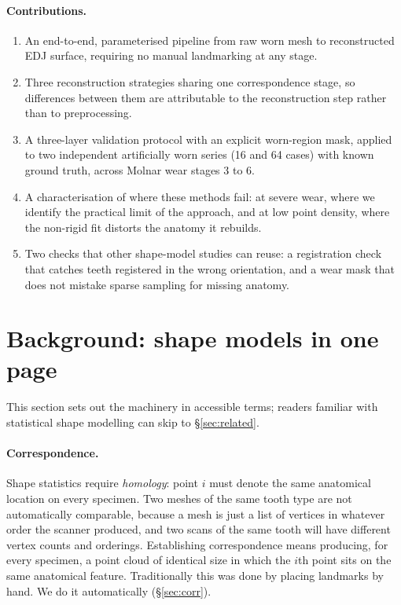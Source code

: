 \documentclass[10pt,a4paper,twocolumn]{article}
\begin{document}
\paragraph{Contributions.}
\begin{enumerate}
  \item An end-to-end, parameterised pipeline from raw worn mesh to reconstructed
        EDJ surface, requiring no manual landmarking at any stage.
  \item Three reconstruction strategies sharing one correspondence stage, so
        differences between them are attributable to the reconstruction step
        rather than to preprocessing.
  \item A three-layer validation protocol with an explicit worn-region mask,
        applied to two independent artificially worn series (16 and 64 cases)
        with known ground truth, across Molnar wear stages 3 to 6.
  \item A characterisation of where these methods fail: at severe wear, where
        we identify the practical limit of the approach, and at low point
        density, where the non-rigid fit distorts the anatomy it rebuilds.
  \item Two checks that other shape-model studies can reuse: a registration
        check that catches teeth registered in the wrong orientation, and a wear
        mask that does not mistake sparse sampling for missing anatomy.
\end{enumerate}

\section{Background: shape models in one page}
\label{sec:background}

This section sets out the machinery in accessible terms; readers familiar with
statistical shape modelling can skip to \S\ref{sec:related}.

\paragraph{Correspondence.}
Shape statistics require \emph{homology}: point $i$ must denote the same
anatomical location on every specimen. Two meshes of the same tooth type are not
automatically comparable, because a mesh is just a list of vertices in whatever
order the scanner produced, and two scans of the same tooth will have different
vertex counts and orderings. Establishing correspondence means producing, for
every specimen, a point cloud of identical size in which the $i$th point sits on
the same anatomical feature. Traditionally this was done by placing landmarks by
hand. We do it automatically (\S\ref{sec:corr}).
\end{document}
